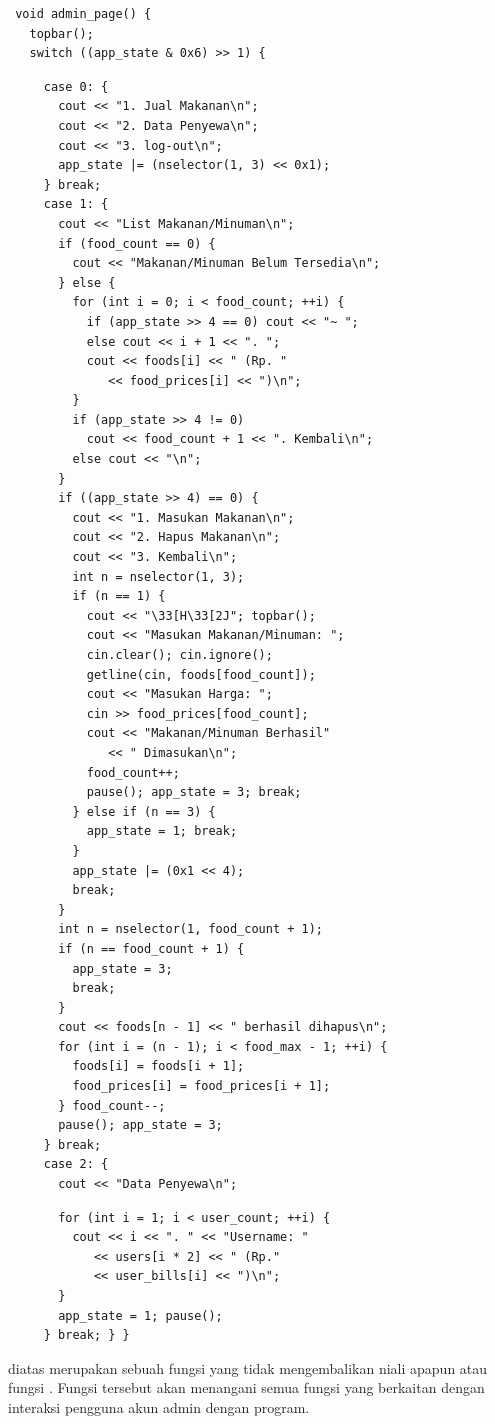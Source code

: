 \documentclass[../main.tex]{subfiles}
\begin{document}
\begin{lstlisting}
 void admin_page() {
   topbar();
   switch ((app_state & 0x6) >> 1) {
\end{lstlisting}
\begin{lstlisting}
     case 0: {
       cout << "1. Jual Makanan\n";
       cout << "2. Data Penyewa\n";
       cout << "3. log-out\n";
       app_state |= (nselector(1, 3) << 0x1);
     } break;
     case 1: {
       cout << "List Makanan/Minuman\n";
       if (food_count == 0) {
         cout << "Makanan/Minuman Belum Tersedia\n";
       } else {
         for (int i = 0; i < food_count; ++i) {
           if (app_state >> 4 == 0) cout << "~ ";
           else cout << i + 1 << ". ";
           cout << foods[i] << " (Rp. "
              << food_prices[i] << ")\n";
         }
         if (app_state >> 4 != 0)
           cout << food_count + 1 << ". Kembali\n";
         else cout << "\n";
       }
       if ((app_state >> 4) == 0) {
         cout << "1. Masukan Makanan\n";
         cout << "2. Hapus Makanan\n";
         cout << "3. Kembali\n";
         int n = nselector(1, 3);
         if (n == 1) {
           cout << "\33[H\33[2J"; topbar();
           cout << "Masukan Makanan/Minuman: ";
           cin.clear(); cin.ignore();
           getline(cin, foods[food_count]);
           cout << "Masukan Harga: ";
           cin >> food_prices[food_count];
           cout << "Makanan/Minuman Berhasil"
              << " Dimasukan\n";
           food_count++;
           pause(); app_state = 3; break;
         } else if (n == 3) {
           app_state = 1; break;
         }
         app_state |= (0x1 << 4);
         break;
       }
       int n = nselector(1, food_count + 1);
       if (n == food_count + 1) {
         app_state = 3;
         break;
       }
       cout << foods[n - 1] << " berhasil dihapus\n";
       for (int i = (n - 1); i < food_max - 1; ++i) {
         foods[i] = foods[i + 1];
         food_prices[i] = food_prices[i + 1];
       } food_count--;
       pause(); app_state = 3;
     } break;
     case 2: {
       cout << "Data Penyewa\n";
\end{lstlisting}
\begin{lstlisting}
       for (int i = 1; i < user_count; ++i) {
         cout << i << ". " << "Username: "
            << users[i * 2] << " (Rp."
            << user_bills[i] << ")\n";
       }
       app_state = 1; pause();
     } break; } }
\end{lstlisting}
    \ilz{}{\Script} diatas merupakan sebuah fungsi yang tidak mengembalikan niali apapun atau fungsi . Fungsi tersebut akan menangani semua fungsi yang berkaitan dengan interaksi pengguna akun admin dengan program.
\end{document}

